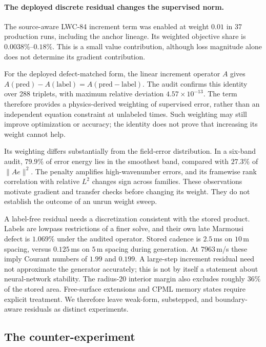 \documentclass[11pt,a4paper]{article}
\begin{document}
\paragraph{The deployed discrete residual changes the supervised norm.}
The source-aware LWC-84 increment term was enabled at weight $0.01$ in 37 production runs,
including the anchor lineage. Its weighted objective share is $0.0038\%$--$0.18\%$.
This is a small value contribution, although loss magnitude alone does not determine its
gradient contribution.

For the deployed defect-matched form, the linear increment operator $A$ gives
$A(\mathrm{pred})-A(\mathrm{label})=A(\mathrm{pred}-\mathrm{label})$.
The audit confirms this identity over 288 triplets, with maximum relative deviation
$4.57\times10^{-13}$. The term therefore provides a physics-derived weighting of supervised
error, rather than an independent equation constraint at unlabeled times. Such weighting may
still improve optimization or accuracy; the identity does not prove that increasing its weight
cannot help.

Its weighting differs substantially from the field-error distribution. In a six-band audit,
$79.9\%$ of error energy lies in the smoothest band, compared with $27.3\%$ of $\lVert Ae\rVert^2$.
The penalty amplifies high-wavenumber errors, and its framewise rank correlation with relative
$L^2$ changes sign across families. These observations motivate gradient and transfer checks
before changing its weight. They do not establish the outcome of an unrun weight sweep.

A label-free residual needs a discretization consistent with the stored product. Labels are
lowpass restrictions of a finer solve, and their own late Marmousi defect is $1.069\%$ under
the audited operator. Stored cadence is $2.5$\,ms on $10$\,m spacing, versus $0.125$\,ms on
$5$\,m spacing during generation. At $7963$\,m/s these imply Courant numbers of $1.99$ and
$0.199$. A large-step increment residual need not approximate the generator accurately;
this is not by itself a statement about neural-network stability. The radius-20 interior
margin also excludes roughly $36\%$ of the stored area. Free-surface extensions and CPML
memory states require explicit treatment. We therefore leave weak-form, substepped, and
boundary-aware residuals as distinct experiments.

\subsection{The counter-experiment}
\end{document}
